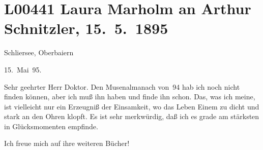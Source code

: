 

\section[Laura Marholm an Arthur Schnitzler, 15. 5. 1895]{L00441 Laura Marholm an Arthur Schnitzler, 15. 5. 1895}
\nopagebreak{}
\rehead{ }\normalsize\beginnumbering{}
\toendnotes[C]{\smallbreak\pagebreak[2]}
\toendnotes[C]{\smallbreak}
\pstart
           \raggedleft{}{\pb}Schliersee, Oberbaiern\pend
           
\pstart
           \raggedleft{}15. Mai 95.\pend
           
\pstart{}Sehr geehrter Herr Doktor.\pend\vspace{0.5em}
\pstart
           Den Musenalmanach von 94 hab ich noch nicht
               finden können, aber ich muß ihn haben und finde ihn schon. Das, was ich meine, ist
               vielleicht nur ein Erzeugniß der Einsamkeit, wo das Leben Einem zu dicht und stark an
               den Ohren klopft. Es ist sehr merkwürdig, daß ich es grade am stärksten in
               Glücksmomenten empfinde.\pend
           
\pstart
           Ich freue mich auf ihre weiteren Bücher!\pend
           
